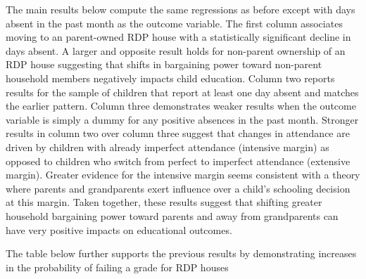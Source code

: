 \documentclass[11pt]{article} %
\begin{document}
The main results below compute the same regressions as before except with days absent in the past month as the outcome variable.  The first column associates moving to an parent-owned RDP house with a statistically significant decline in days absent.  A larger and opposite result holds for non-parent ownership of an RDP house suggesting that shifts in bargaining power toward non-parent household members negatively impacts child education.  Column two reports results for the sample of children that report at least one day absent and matches the earlier pattern.  Column three demonstrates weaker results when the outcome variable is simply a dummy for any positive absences in the past month.  Stronger results in column two over column three suggest that changes in attendance are driven by children with already imperfect attendance (intensive margin) as opposed to children who switch from perfect to imperfect attendance (extensive margin).  Greater evidence for the intensive margin seems consistent with a theory where parents and grandparents exert influence over a child's schooling decision at this margin.  Taken together, these results suggest that shifting greater household bargaining power toward parents and away from grandparents can have very positive impacts on educational outcomes.

\begin{center}
	
\end {center}

The table below further supports the previous results by demonstrating increases in the probability of failing a grade for RDP houses 

%	

\begin{center}
	
\end {center}


\begin{center}
	
\end {center}
\end{document}
